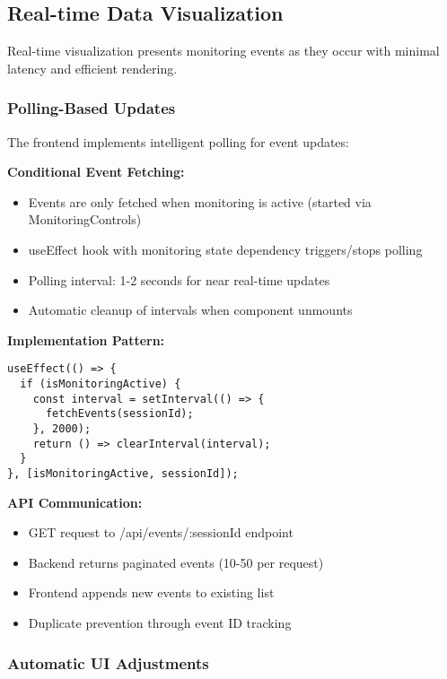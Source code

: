 \subsection{Real-time Data Visualization}

Real-time visualization presents monitoring events as they occur with minimal latency and efficient rendering.

\subsubsection{Polling-Based Updates}

The frontend implements intelligent polling for event updates:

\textbf{Conditional Event Fetching:}
\begin{itemize}
    \item Events are only fetched when monitoring is active (started via MonitoringControls)
    \item useEffect hook with monitoring state dependency triggers/stops polling
    \item Polling interval: 1-2 seconds for near real-time updates
    \item Automatic cleanup of intervals when component unmounts
\end{itemize}

\textbf{Implementation Pattern:}
\begin{verbatim}
useEffect(() => {
  if (isMonitoringActive) {
    const interval = setInterval(() => {
      fetchEvents(sessionId);
    }, 2000);
    return () => clearInterval(interval);
  }
}, [isMonitoringActive, sessionId]);
\end{verbatim}

\textbf{API Communication:}
\begin{itemize}
    \item GET request to /api/events/:sessionId endpoint
    \item Backend returns paginated events (10-50 per request)
    \item Frontend appends new events to existing list
    \item Duplicate prevention through event ID tracking
\end{itemize}

\subsubsection{Automatic UI Adjustments}

